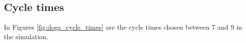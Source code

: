 \subsection{Cycle times}
In Figures \ref{fig:dogs_cycle_times} are the cycle times chosen between 7 and 9 in the simulation.

\begin{figure}[htbp]
\centering
{}


\end{figure}
